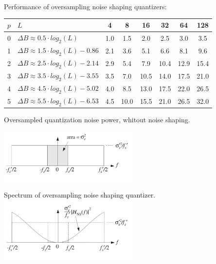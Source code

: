 Performance of oversampling noise shaping quantizers:

\begin{tabularx}{0.75\textwidth}{|c|X|c|c|c|c|c|c|}
	\hline
	$p$	& $L$							& 4		& 8		& 16	& 32	& 64	& 128
	\\ \hline
	0	& $\Delta B \approx 0.5 \cdot log_2(L)$		& 1.0	& 1.5	& 2.0	& 2.5	& 3.0	& 3.5 \\
	1	& $\Delta B \approx 1.5 \cdot log_2(L) - 0.86$ & 2.1	& 3.6	& 5.1	& 6.6	& 8.1	& 9.6 \\
	2	& $\Delta B \approx 2.5 \cdot log_2(L) - 2.14$	& 2.9	& 5.4	& 7.9	& 10.4	& 12.9	& 15.4 \\
	3	& $\Delta B \approx 3.5 \cdot log_2(L) - 3.55$	& 3.5	& 7.0	& 10.5	& 14.0	& 17.5	& 21.0 \\
	4	& $\Delta B \approx 4.5 \cdot log_2(L) - 5.02$	& 4.0	& 8.5	& 13.0	& 17.5	& 22.0	& 26.5 \\
	5	& $\Delta B \approx 5.5 \cdot log_2(L) - 6.53$	& 4.5	& 10.0	& 15.5	& 21.0	& 26.5	& 32.0 \\
	\hline
\end{tabularx}
\resetArrayStretch
\begin{multicols}{2}
  Oversampled quantization noise power, whitout noise shaping.
  
  \includegraphics[width=7cm]{./picture/no_noise_shaping}
  
\columnbreak

  Spectrum of oversampling noise shaping quantizer.
  \includegraphics[width=7cm]{./picture/noise_shaping}
\end{multicols}


